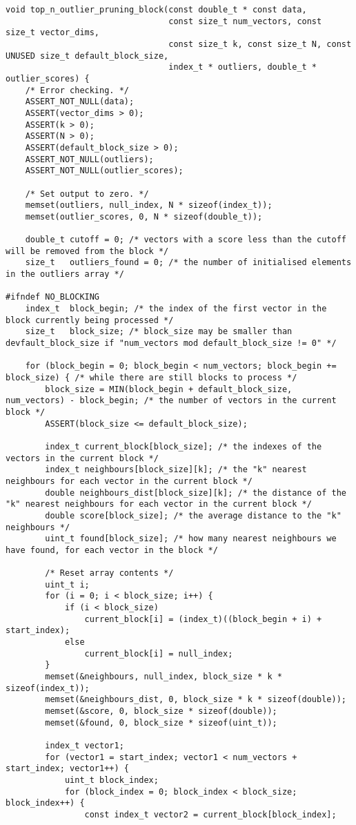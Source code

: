 \begin{lstlisting}
void top_n_outlier_pruning_block(const double_t * const data,
								 const size_t num_vectors, const size_t vector_dims,
								 const size_t k, const size_t N, const UNUSED size_t default_block_size,
								 index_t * outliers, double_t * outlier_scores) {
	/* Error checking. */
	ASSERT_NOT_NULL(data);
	ASSERT(vector_dims > 0);
	ASSERT(k > 0);
	ASSERT(N > 0);
	ASSERT(default_block_size > 0);
	ASSERT_NOT_NULL(outliers);
	ASSERT_NOT_NULL(outlier_scores);
	
	/* Set output to zero. */
	memset(outliers, null_index, N * sizeof(index_t));
	memset(outlier_scores, 0, N * sizeof(double_t));
	
	double_t cutoff = 0; /* vectors with a score less than the cutoff will be removed from the block */
	size_t   outliers_found = 0; /* the number of initialised elements in the outliers array */
	
#ifndef NO_BLOCKING
	index_t  block_begin; /* the index of the first vector in the block currently being processed */
	size_t   block_size; /* block_size may be smaller than devfault_block_size if "num_vectors mod default_block_size != 0" */
	
	for (block_begin = 0; block_begin < num_vectors; block_begin += block_size) { /* while there are still blocks to process */
		block_size = MIN(block_begin + default_block_size, num_vectors) - block_begin; /* the number of vectors in the current block */
		ASSERT(block_size <= default_block_size);
		
		index_t current_block[block_size]; /* the indexes of the vectors in the current block */
		index_t neighbours[block_size][k]; /* the "k" nearest neighbours for each vector in the current block */
		double neighbours_dist[block_size][k]; /* the distance of the "k" nearest neighbours for each vector in the current block */
		double score[block_size]; /* the average distance to the "k" neighbours */
		uint_t found[block_size]; /* how many nearest neighbours we have found, for each vector in the block */
		
		/* Reset array contents */
		uint_t i;
		for (i = 0; i < block_size; i++) {
			if (i < block_size)
				current_block[i] = (index_t)((block_begin + i) + start_index);
			else
				current_block[i] = null_index;
		}
		memset(&neighbours, null_index, block_size * k * sizeof(index_t));
		memset(&neighbours_dist, 0, block_size * k * sizeof(double));
		memset(&score, 0, block_size * sizeof(double));
		memset(&found, 0, block_size * sizeof(uint_t));
		
		index_t vector1;
		for (vector1 = start_index; vector1 < num_vectors + start_index; vector1++) {
			uint_t block_index;
			for (block_index = 0; block_index < block_size; block_index++) {
				const index_t vector2 = current_block[block_index];
				

\end{lstlisting}
